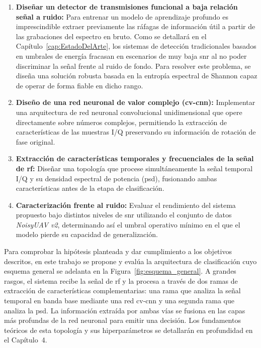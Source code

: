\begin{enumerate}
 \item \textbf{Diseñar un detector de transmisiones funcional a baja relación señal a ruido:} Para entrenar un modelo de aprendizaje profundo es imprescindible extraer previamente las ráfagas de información útil a partir de las grabaciones del espectro en bruto. Como se detallará en el Capítulo~\ref{cap:EstadoDelArte}, los sistemas de detección tradicionales basados en umbrales de energía fracasan en escenarios de muy baja \gls{snr} al no poder discriminar la señal frente al ruido de fondo. Para resolver este problema, se diseña una solución robusta basada en la entropía espectral de Shannon capaz de operar de forma fiable en dicho rango.

 \item \textbf{Diseño de una red neuronal de valor complejo (\gls{cv-cnn}):} Implementar una arquitectura de red neuronal convolucional unidimensional que opere directamente sobre números complejos, permitiendo la extracción de características de las muestras I/Q preservando su información de rotación de fase original.

 \item \textbf{Extracción de características temporales y frecuenciales de la señal de \gls{rf}:} Diseñar una topología que procese simultáneamente la señal temporal I/Q y su densidad espectral de potencia (\gls{psd}), fusionando ambas características antes de la etapa de clasificación.

 \item \textbf{Caracterización frente al ruido:} Evaluar el rendimiento del sistema propuesto bajo distintos niveles de \gls{snr} utilizando el conjunto de datos \textit{NoisyUAV v2}, determinando así el umbral operativo mínimo en el que el modelo pierde su capacidad de generalización.
\end{enumerate}

Para comprobar la hipótesis planteada y dar cumplimiento a los objetivos descritos, en este trabajo se propone y evalúa la arquitectura de clasificación cuyo esquema general se adelanta en la Figura~\ref{fig:esquema_general}. A grandes rasgos, el sistema recibe la señal de \gls{rf} y la procesa a través de dos ramas de extracción de características complementarias: una rama que analiza la señal temporal en banda base mediante una red \gls{cv-cnn} y una segunda rama que analiza la \gls{psd}. La información extraída por ambas vías se fusiona en las capas más profundas de la red neuronal para emitir una decisión. Los fundamentos teóricos de esta topología y sus hiperparámetros se detallarán en profundidad en el Capítulo~4.

